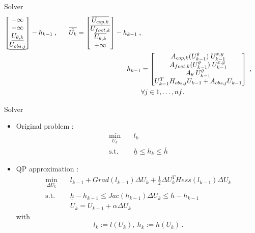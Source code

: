 \begin{frame}{Solver}
\begin{align}
\begin{bmatrix}
        -\infty \\
        -\infty \\
        \underline{U_{\theta,k}}\\
        \underline{U_{obs,j}}
    \end{bmatrix}
    - h_{k-1} \;,\;\;\;\;\;\;
    \overline{\tilde{U_k}} =
    \begin{bmatrix}
        \overline{U_{cop,k}} \\
        \overline{U_{foot,k}} \\
        \overline{U_{\theta,k}} \\
        +\infty
    \end{bmatrix}
    - h_{k-1} \;, \notag \\
    h_{k-1} &=
    \begin{bmatrix}
        A_{cop,k}(U_{k-1}^\theta) \; U_{k-1}^{x,y} \\
        A_{foot,k}(U_{k-1}^\theta) \; U_{k-1}^{x,y} \\
        A_{\theta} \; U_{k-1}^{\theta} \\
        U_{k-1}^T H_{obs,j} U_{k-1} + A_{obs,j} U_{k-1}
    \end{bmatrix} \; , \; \notag \\
    &\forall j \in {1, \hdots , nf} \notag
    .
\end{align}

\end{frame}



\begin{frame}{Solver}

\begin{itemize}
\item Original problem :
  \begin{align*}
    \min_{U_k}  \quad & l_k \\
    \text{s.t.} \quad & \underline{h} \leq h_k \leq \overline{h}
  \end{align*}
\item QP approximation :
  \begin{align*}
    \min_{\Delta U_k} \quad & l_{k-1} + Grad(l_{k-1}) \Delta U_k +
    \frac{1}{2} \Delta U_k^T Hess(l_{k-1}) \Delta U_k \\
    \text{s.t.} \quad & \underline{h} - h_{k-1} \leq Jac(h_{k-1}) \Delta U_k \leq \overline{h} - h_{k-1}\\
     & U_k = U_{k-1} + \alpha \Delta U_k
  \end{align*}
  with
\begin{equation*}
    l_k := l(U_k),\ h_k := h(U_k) \,.
\end{equation*}
\end{itemize}
\end{frame}

